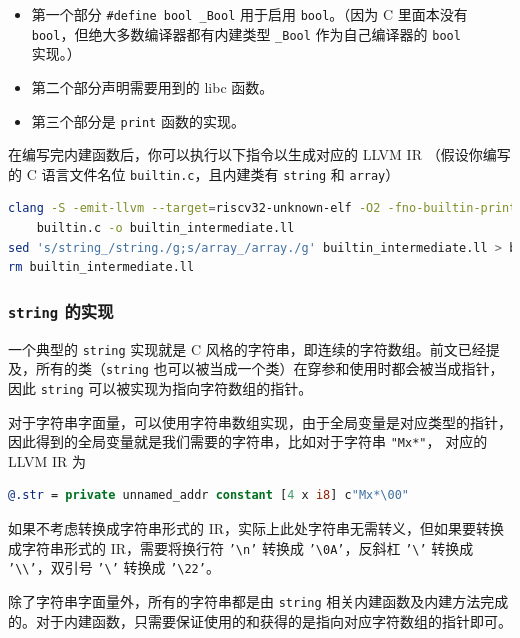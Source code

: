 \begin{itemize}
  \item 第一个部分 \texttt{\#define bool \_Bool} 用于启用 \texttt{bool}。（因为 C 里面本没有
    \texttt{bool}，但绝大多数编译器都有内建类型 \texttt{\_Bool} 作为自己编译器的 \texttt{bool}
    实现。）
  \item 第二个部分声明需要用到的 libc 函数。
  \item 第三个部分是 \texttt{print} 函数的实现。
\end{itemize}

在编写完内建函数后，你可以执行以下指令以生成对应的 LLVM IR
（假设你编写的 C 语言文件名位 \texttt{builtin.c}，且内建类有
\texttt{string} 和 \texttt{array}）
\begin{lstlisting}[language=sh]
clang -S -emit-llvm --target=riscv32-unknown-elf -O2 -fno-builtin-printf -fno-builtin-memcpy \
    builtin.c -o builtin_intermediate.ll
sed 's/string_/string./g;s/array_/array./g' builtin_intermediate.ll > builtin.ll
rm builtin_intermediate.ll
\end{lstlisting}

\subsubsection{\texttt{string} 的实现}\label{AST-to-IR-for-builtin-string}

一个典型的 \texttt{string} 实现就是 C 风格的字符串，即连续的字符数组。前文已经提及，所有的类（\texttt{string}
也可以被当成一个类）在穿参和使用时都会被当成指针，因此 \texttt{string}
可以被实现为指向字符数组的指针。

对于字符串字面量，可以使用字符串数组实现，由于全局变量是对应类型的指针，
因此得到的全局变量就是我们需要的字符串，比如对于字符串 \texttt{"Mx*"}，
对应的 LLVM IR 为
\begin{lstlisting}[language=llvm]
@.str = private unnamed_addr constant [4 x i8] c"Mx*\00"
\end{lstlisting}

如果不考虑转换成字符串形式的 IR，实际上此处字符串无需转义，但如果要转换成字符串形式的
IR，需要将换行符 \texttt{'\textbackslash{}n'} 转换成 \texttt{'\textbackslash{}0A'}，反斜杠
\texttt{'\textbackslash'} 转换成 \texttt{'\textbackslash\textbackslash'}，双引号
\texttt{'\textbackslash'} 转换成 \texttt{'\textbackslash22'}。

除了字符串字面量外，所有的字符串都是由 \texttt{string}
相关内建函数及内建方法完成的。对于内建函数，只需要保证使用的和获得的是指向对应字符数组的指针即可。

